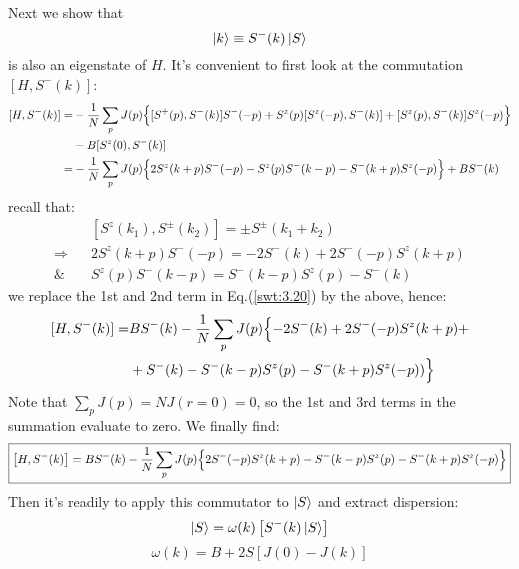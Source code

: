 \documentclass[11pt]{article}
\theoremstyle{remark}
\theoremstyle{definition}
\numberwithin{thm}{section}
\numberwithin{equation}{section}
\begin{document}
Next we show that
\begin{equation}
	\ket{k} \equiv S^-(k)\ket{S}
\end{equation}
is also an eigenstate of $H$. It's convenient to first look at the commutation $[H,S^-(k)]$:
\begin{equation} \label{swt:3.20}
	\begin{split}
		[H,S^-(k)] = &-\frac{1}{N}\sum_{p}J(p)\Bigl\{ [S^+(p), S^-(k)]S^-(-p) + S^z(p)[S^z(-p),S^-(k)] + [S^z(p), S^-(k)]S^z(-p) \Bigr\} \\
			   &- B[S^z(0), S^-(k)]\\
		=& -\frac{1}{N}\sum_{p}J(p) \Bigl\{ 2S^z(k+p)S^-(-p) - S^z(p)S^-(k-p) - S^-(k+p)S^z(-p) \Bigr\}   + BS^-(k)
	\end{split}
\end{equation}
recall that:
\begin{equation}
	\begin{split}
		&[S^z(k_1), S^\pm(k_2)] = \pm S^\pm(k_1+k_2)\\
		\Rightarrow\;\;\; & 2S^z(k+p)S^-(-p) = -2S^-(k) + 2S^-(-p)S^z(k+p)\\
		\& \;\;\; & S^z(p)S^-(k-p) = S^-(k-p)S^z(p) - S^-(k)
	\end{split}
\end{equation}
we replace the 1st and 2nd term in Eq.(\ref{swt:3.20}) by the above, hence:
\begin{equation}
	\begin{split}
		[H,S^-(k)] =& BS^-(k)- \frac{1}{N}\sum_{p}J(p) \Bigl\{ -2S^-(k) + 2S^-(-p)S^z(k+p) +  \\
			    & + S^-(k) - S^-(k-p)S^z(p) - S^-(k+p)S^z(-p)) \Bigr\} 
	\end{split}
\end{equation}
Note that $\sum_{p}J(p) = NJ(r=0) = 0$, so the 1st and 3rd terms in the summation evaluate to zero. We finally find:
\begin{equation}
	\boxed{\left[H, S^-(k)\right] = BS^-(k) - \frac{1}{N}\sum_{p}J(p) \Bigl\{ 2S^-(-p)S^z(k+p) - S^-(k-p)S^z(p) - S^-(k+p)S^z(-p) \Bigr\} }  
\end{equation}
Then it's readily to apply this commutator to $\ket{S}$ and extract dispersion:
\begin{equation}
	[H, S^-(k)]\ket{S} = \omega(k)\left[ S^-(k)\ket{S} \right]
\end{equation}
\begin{equation}
\boxed{\omega(k) = B + 2S\left[J(0) - J(k)\right]}
\end{equation}
\end{document}
